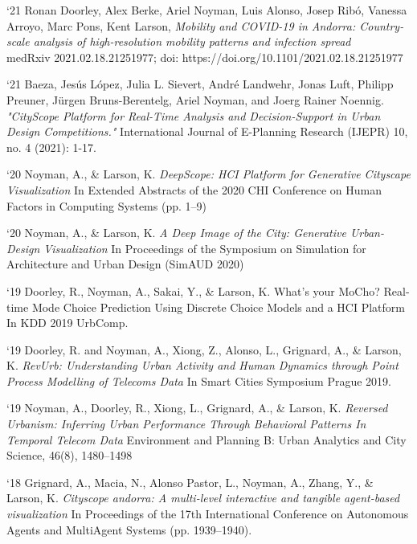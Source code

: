 \begin{tablist}
    \item[`21] \tab
    Ronan Doorley, Alex Berke, Ariel Noyman, Luis Alonso, Josep Ribó, Vanessa Arroyo, Marc Pons, Kent Larson,
    \textit{Mobility and COVID-19 in Andorra: Country-scale analysis of high-resolution mobility patterns and infection spread}
    \\
    medRxiv 2021.02.18.21251977; doi: https://doi.org/10.1101/2021.02.18.21251977


    \item[`21] \tab
    Baeza, Jesús López, Julia L. Sievert, André Landwehr, Jonas Luft, Philipp Preuner, Jürgen Bruns-Berentelg, Ariel Noyman, and Joerg Rainer Noennig. \textit{"CityScope Platform for Real-Time Analysis and Decision-Support in Urban Design Competitions."} International Journal of E-Planning Research (IJEPR) 10, no. 4 (2021): 1-17.


    \item[`20] \tab  Noyman, A., \& Larson, K.
    \textit{DeepScope: HCI Platform for Generative Cityscape Visualization
    }
    In Extended Abstracts of the 2020 CHI Conference on Human Factors in Computing Systems (pp. 1–9)

    \item[`20] \tab  Noyman, A., \& Larson, K.
    \textit{A Deep Image of the City: Generative Urban-Design Visualization
    }
    In Proceedings of the Symposium on Simulation for Architecture and Urban Design (SimAUD 2020)


    \item[`19] \tab  Doorley, R., Noyman, A., Sakai, Y., \& Larson, K.
    What’s your MoCho? Real-time Mode Choice Prediction Using Discrete Choice Models and a HCI Platform
    In KDD 2019 UrbComp.

    \item[`19] \tab  Doorley, R. and Noyman, A., Xiong, Z., Alonso, L., Grignard, A., \& Larson, K.
    \textit{RevUrb: Understanding Urban Activity and Human Dynamics through Point Process Modelling of Telecoms Data}
    In Smart Cities Symposium Prague 2019.

    \item[`19] \tab  Noyman, A., Doorley, R., Xiong, L., Grignard, A., \& Larson, K.
    \textit{Reversed Urbanism: Inferring Urban Performance Through Behavioral Patterns In Temporal Telecom Data}
    Environment and Planning B: Urban Analytics and City Science, 46(8), 1480–1498

    \item[`18] \tab  Grignard, A., Macia, N., Alonso Pastor, L., Noyman, A., Zhang, Y., \& Larson, K.
    \textit{Cityscope andorra: A multi-level interactive and tangible agent-based visualization}
    In Proceedings of the 17th International Conference on Autonomous Agents and MultiAgent Systems (pp. 1939–1940).


\end{tablist}
